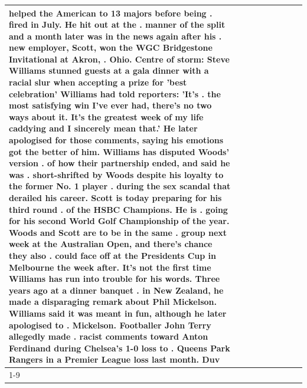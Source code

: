\begin{table}[H]
\begin{tabular}{lllrlllll}
helped the American to 13 majors before being . fired in July. He hit out at the . manner of the split and a month later was in the news again after his . new employer, Scott, won the WGC Bridgestone Invitational at Akron, . Ohio. Centre of storm: Steve Williams stunned guests at a gala dinner with a racial slur when accepting a prize for 'best celebration' Williams had told reporters: 'It's . the most satisfying win I've ever had, there's no two ways about it. It's the greatest week of my life caddying and I sincerely mean that.' He later apologised for those comments, saying his emotions got the better of him. Williams has disputed Woods' version . of how their partnership ended, and said he was . short-shrifted by Woods despite his loyalty to the former No. 1 player . during the sex scandal that derailed his career. Scott is today preparing for his third round . of the HSBC Champions. He is . going for his second World Golf Championship of the year. Woods and Scott are to be in the same . group next week at the Australian Open, and there's chance they also . could face off at the Presidents Cup in Melbourne the week after. It's not the first time Williams has run into trouble for his words. Three years ago at a dinner banquet . in New Zealand, he made a disparaging remark about Phil Mickelson. Williams said it was meant in fun, although he later apologised to . Mickelson. Footballer John Terry allegedly made . racist comments toward Anton Ferdinand during Chelsea's 1-0 loss to . Queens Park Rangers in a Premier League loss last month. Duv \\
\cline{1-9}

\end{tabular}
\end{table}

